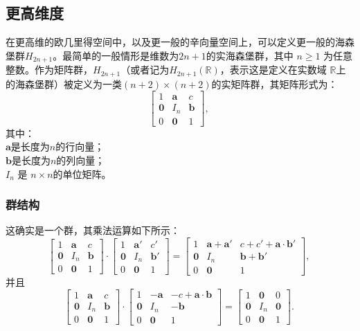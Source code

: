 \subsection{更高维度}
在更高维的欧几里得空间中，以及更一般的辛向量空间上，可以定义更一般的海森堡群$H_{2n+1}$。最简单的一般情形是维数为$2n+1$的实海森堡群，其中 $n \geq 1$ 为任意整数。作为矩阵群，$H_{2n+1}$（或者记为$H_{2n+1}(\mathbb{R})$，表示这是定义在实数域 $\mathbb{R}$上的海森堡群）被定义为一类$(n+2)\times(n+2)$的实矩阵群，其矩阵形式为：
$$
\begin{bmatrix}
1 & \mathbf{a} & c \\
\mathbf{0} & I_{n} & \mathbf{b} \\
0 & \mathbf{0} & 1
\end{bmatrix},~
$$
其中：\\
$\mathbf{a}$是长度为$n$的行向量；\\
$\mathbf{b}$是长度为$n$的列向量；\\
$I_{n}$ 是 $n \times n$的单位矩阵。
\subsubsection{群结构}
这确实是一个群，其乘法运算如下所示：
$$
\begin{bmatrix}
1 & \mathbf{a} & c \\
\mathbf{0} & I_{n} & \mathbf{b} \\
0 & \mathbf{0} & 1
\end{bmatrix}
\cdot
\begin{bmatrix}
1 & \mathbf{a}' & c' \\
\mathbf{0} & I_{n} & \mathbf{b}' \\
0 & \mathbf{0} & 1
\end{bmatrix}
=
\begin{bmatrix}
1 & \mathbf{a} + \mathbf{a}' & c + c' + \mathbf{a} \cdot \mathbf{b}' \\
\mathbf{0} & I_{n} & \mathbf{b} + \mathbf{b}' \\
0 & \mathbf{0} & 1
\end{bmatrix},~
$$
并且
$$
\begin{bmatrix}
1 & \mathbf{a} & c \\
\mathbf{0} & I_{n} & \mathbf{b} \\
0 & \mathbf{0} & 1
\end{bmatrix}
\cdot
\begin{bmatrix}
1 & -\mathbf{a} & -c + \mathbf{a} \cdot \mathbf{b} \\
\mathbf{0} & I_{n} & -\mathbf{b} \\
0 & \mathbf{0} & 1
\end{bmatrix}
=
\begin{bmatrix}
1 & \mathbf{0} & 0 \\
\mathbf{0} & I_{n} & \mathbf{0} \\
0 & \mathbf{0} & 1
\end{bmatrix}.~
$$
